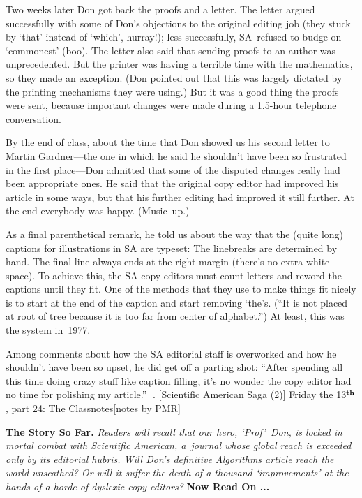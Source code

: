 Two weeks later
 Don got back the proofs and a letter.  The letter argued successfully with
some of Don's objections to the original editing job 
(they stuck by `that' instead of `which', hurray!); less successfully,
SA~refused to budge on `commonest' (boo). The letter also
 said that sending
proofs to an author was unprecedented.  But the printer was having a
terrible time with the mathematics, so they made an exception.
(Don pointed out that this was
largely dictated by the printing mechanisms they were using.)
But it was a good thing the proofs were sent, because important changes
were made during a 1.5-hour telephone conversation.

By the end of class, about the time that Don showed us his second letter
to Martin Gardner---the one in which he said he shouldn't have been so
frustrated in the first place---Don admitted that some of the disputed
changes really had been appropriate ones.  He said that the original copy
editor had improved his article in some ways,
 but that his further editing had improved
it still further. At the end everybody was happy. (Music~up.)

As a final parenthetical remark, he told us about the way that the (quite
long) captions for  illustrations in SA are typeset: The linebreaks are
determined by hand.  The final line always ends at the right margin
(there's no extra white space). To achieve this, the SA copy editors
must count letters and reword the
captions until they fit.  One of the methods that they use to make things
 fit nicely is to start at the end of the caption and start
removing `the's. (``It is not placed at root of tree because it is too far
from center of alphabet.'') At least, this was the system in~1977.

Among comments about how the SA editorial staff is overworked and how he
shouldn't have been so upset, he did get off a parting shot:
``After spending all this time doing crazy
stuff like caption filling, it's
no wonder the copy editor had no time for polishing
my article.''
. [Scientific American Saga (2)] Friday the 13$^{\bf th}$,
 part 24: The Classnotes\hfill[notes by PMR]

{\bf The Story So Far.}  {\it Readers will recall that our hero,
`Prof'~Don, is locked in mortal combat with {\sl Scientific American},
a~journal whose global reach is exceeded only by its editorial hubris.
Will Don's definitive {\sl Algorithms\/} article reach the world
unscathed? Or will it suffer the death of a thousand `improvements' at
the hands of a horde of dyslexic copy-editors?}  {\bf Now Read On
.\thinspace.\thinspace.}

